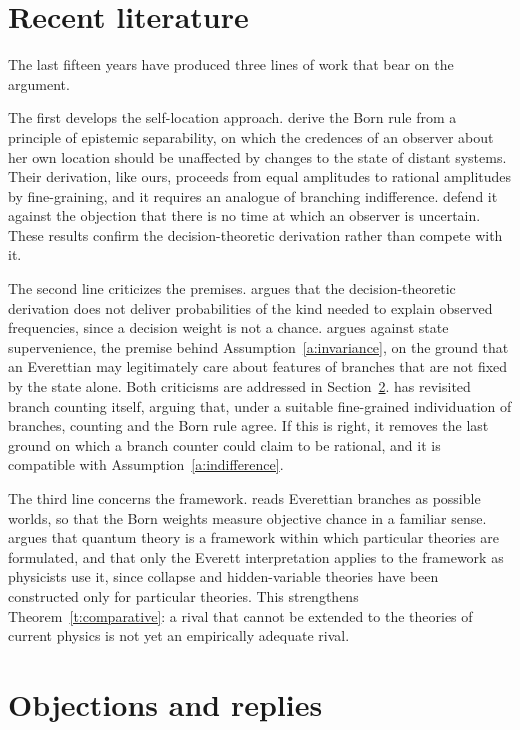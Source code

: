 \documentclass{situationist-preprint}
\begin{document}
\section{Recent literature}\label{s:recent}

The last fifteen years have produced three lines of work that bear on the argument.

The first develops the self-location approach. \citet{SebensCarroll2018} derive the Born rule from a principle of epistemic separability, on which the credences of an observer about her own location should be unaffected by changes to the state of distant systems. Their derivation, like ours, proceeds from equal amplitudes to rational amplitudes by fine-graining, and it requires an analogue of branching indifference. \citet{McQueenVaidman2019} defend it against the objection that there is no time at which an observer is uncertain. These results confirm the decision-theoretic derivation rather than compete with it.

The second line criticizes the premises. \citet{DizadjiBahmani2015} argues that the decision-theoretic derivation does not deliver probabilities of the kind needed to explain observed frequencies, since a decision weight is not a chance. \citet{Jansson2016} argues against state supervenience, the premise behind Assumption~\ref{a:invariance}, on the ground that an Everettian may legitimately care about features of branches that are not fixed by the state alone. Both criticisms are addressed in Section~\ref{s:objections}. \citet{Saunders2021} has revisited branch counting itself, arguing that, under a suitable fine-grained individuation of branches, counting and the Born rule agree. If this is right, it removes the last ground on which a branch counter could claim to be rational, and it is compatible with Assumption~\ref{a:indifference}.

The third line concerns the framework. \citet{Wilson2020} reads Everettian branches as possible worlds, so that the Born weights measure objective chance in a familiar sense. \citet{Wallace2020} argues that quantum theory is a framework within which particular theories are formulated, and that only the Everett interpretation applies to the framework as physicists use it, since collapse and hidden-variable theories have been constructed only for particular theories. This strengthens Theorem~\ref{t:comparative}: a rival that cannot be extended to the theories of current physics is not yet an empirically adequate rival.

\section{Objections and replies}\label{s:objections}
\end{document}
